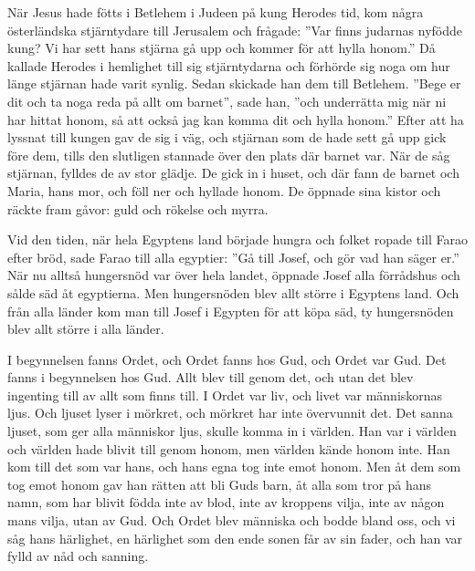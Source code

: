 	


När Jesus hade fötts i Betlehem i Judeen på kung Herodes tid, kom några österländska stjärntydare till Jerusalem 
och frågade: ”Var finns judarnas nyfödde kung? Vi har sett hans stjärna gå upp och kommer för att hylla honom.” 
Då kallade Herodes i hemlighet till sig stjärntydarna och förhörde sig noga om hur länge stjärnan hade varit synlig. 
Sedan skickade han dem till Betlehem. ”Bege er dit och ta noga reda på allt om barnet”, sade han, ”och underrätta mig när ni har hittat honom, så att också jag kan komma dit och hylla honom.” 
Efter att ha lyssnat till kungen gav de sig i väg, och stjärnan som de hade sett gå upp gick före dem, tills den slutligen stannade över den plats där barnet var. 
När de såg stjärnan, fylldes de av stor glädje. 
De gick in i huset, och där fann de barnet och Maria, hans mor, och föll ner och hyllade honom. De öppnade sina kistor och räckte fram gåvor: guld och rökelse och myrra. 

\newpage
{}

Vid den tiden, när hela Egyptens land började hungra och folket ropade till Farao efter bröd, sade Farao till alla egyptier: ”Gå till Josef, och gör vad han säger er.” 
När nu alltså hungersnöd var över hela landet, öppnade Josef alla förrådshus och sålde säd åt egyptierna. Men hungersnöden blev allt större i Egyptens land. 
Och från alla länder kom man till Josef i Egypten för att köpa säd, ty hungersnöden blev allt större i alla länder.



I begynnelsen fanns Ordet, och Ordet fanns hos Gud, och Ordet var Gud. 
Det fanns i begynnelsen hos Gud. 
Allt blev till genom det, och utan det blev ingenting till av allt som finns till. 
I Ordet var liv, och livet var människornas ljus. 
Och ljuset lyser i mörkret, och mörkret har inte övervunnit det.
Det sanna ljuset, som ger alla människor ljus, skulle komma in i världen. 
Han var i världen och världen hade blivit till genom honom, men världen kände honom inte. 
Han kom till det som var hans, och hans egna tog inte emot honom. 
Men åt dem som tog emot honom gav han rätten att bli Guds barn, åt alla som tror på hans namn, 
som har blivit födda inte av blod, inte av kroppens vilja, inte av någon mans vilja, utan av Gud.
Och Ordet blev människa och bodde bland oss, och vi såg hans härlighet, en härlighet som den ende sonen får av sin fader, och han var fylld av nåd och sanning.




